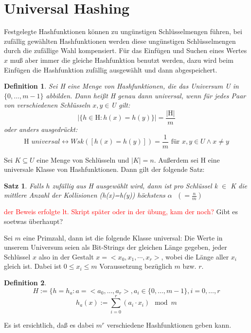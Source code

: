 \documentclass[ngerman,draft,parskip=half*,twoside]{scrreprt}
\theoremstyle{break}
\newtheorem{definition}{Definition}
\newtheorem{satz}{Satz}
\begin{document}
\section{Universal Hashing}
Festgelegte Hashfunktionen können zu ungünstigen Schlüsselmengen führen, bei zufällig gewählten Hashfunktionen
werden diese ungünstigen Schlüsselmengen durch die zufällige Wahl kompensiert. Für das Einfügen und Suchen eines Wertes
$x$ muß aber immer die gleiche Hashfunktion benutzt werden, dazu wird beim Einfügen die Hashfunktion zufällig
ausgewählt und dann abgespeichert.

\begin{definition}
Sei H eine Menge von Hashfunktionen, die das Universum U in $\{0, \ldots, m-1\}$ abbilden. Dann heißt H genau dann
universal, wenn für jedes Paar von verschiedenen Schlüsseln $x, y \in $U gilt:
\[\vert\{h \in \mbox{H} : h(x)=h(y)\}\vert=\frac{\vert \mbox{H}\vert}{m}\]
oder anders ausgedrückt:
\[\mbox{H }universal \leftrightarrow Wsk([h(x)=h(y)])=\frac{1}{m} \mbox{ für }x,  y \in U \wedge x\not=y\]
\end{definition}

Sei $K \subseteq U$ eine Menge von Schlüsseln und $\vert K\vert =n$. Außerdem sei H eine universale Klasse von
Hashfunktionen. Dann gilt der folgende Satz:
\begin{satz}
Falls $h$ zufällig aus H ausgewählt wird, dann ist pro Schlüssel k $\in$ K die mittlere Anzahl der Kollisionen
(h(x)=h(y)) höchstens $\alpha \mbox{ } (=\frac{n}{m})$
\end{satz}
\textcolor{red}{der Beweis erfolgte lt. Skript später oder in der übung, kam der noch?}
Gibt es soetwas überhaupt?

Sei $m$ eine Primzahl, dann ist die folgende Klasse universal:
Die Werte in unserem Universum seien als Bit-Strings der gleichen Länge gegeben, jeder Schlüssel $x$ also in der
Gestalt $x=<x_0, x_1, \cdots, x_r>$, wobei die Länge aller $x_i$ gleich ist.  Dabei ist $0\leq x_i\leq m$ Voraussetzung
bezüglich $m$ bzw. $r$.
\begin{definition}
\[H:=\{h=h_a : a=<a_0, \ldots, a_r>, a_i \in \{0, \ldots, m-1\}, i=0, \ldots, r\]
\[h_a(x):=\sum_{i=0}^r (a_i \cdot x_i) \mod m\]
\end{definition}
Es ist ersichtlich, daß es dabei $m^r$ verschiedene Hashfunktionen geben kann.
\end{document}
